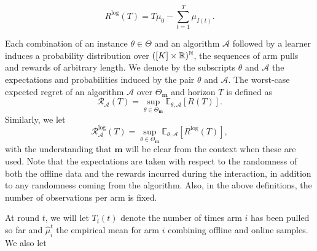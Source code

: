 \[
R^{\text{log}}(T)=
T\mu_0 - \sum_{t=1}^T\mu_{I(t)}.
\]

Each combination of an instance $\theta\in \Theta$ and an algorithm $\mathcal{A}$ followed by a learner induces a probability distribution over $([K]\times \mathbb{R})^\mathbb{N}$, 
the sequences of arm pulls and rewards of arbitrary length.
We denote by the subscripts $\theta$ and $\mathcal{A}$ the expectations and probabilities induced by the pair $\theta$ and $\mathcal{A}$. The worst-case expected regret of an algorithm $\mathcal{A}$ over $\Theta_{\mathbf{m}}$ and horizon $T$ is  defined as
\[
\mathcal{R}_\mathcal{A}(T)= \sup_{\theta \in \Theta_{\mathbf{m}}}\mathbb{E}_{\theta, \mathcal{A}}[R(T)].
\]
Similarly, we let
\[
\mathcal{R}^{\text{log}}_\mathcal{A}(T)= \sup_{\theta \in \Theta_{\mathbf{m}}}\mathbb{E}_{\theta, \mathcal{A}}[R^{\text{log}}(T)],
\]
with the understanding that $\mathbf{m}$ will be clear from the context when these are used.
Note that the expectations are taken with respect to the randomness of both the offline data and the rewards incurred during the interaction, in addition to any randomness coming from the algorithm. Also, in the above definitions, the number of observations per arm is fixed.


At round $t$, we will let $T_i(t)$ denote the number of times arm $i$ has been pulled so far and $\hat{\mu}_i^t$ the empirical mean for arm $i$ combining offline and online samples. We also let

